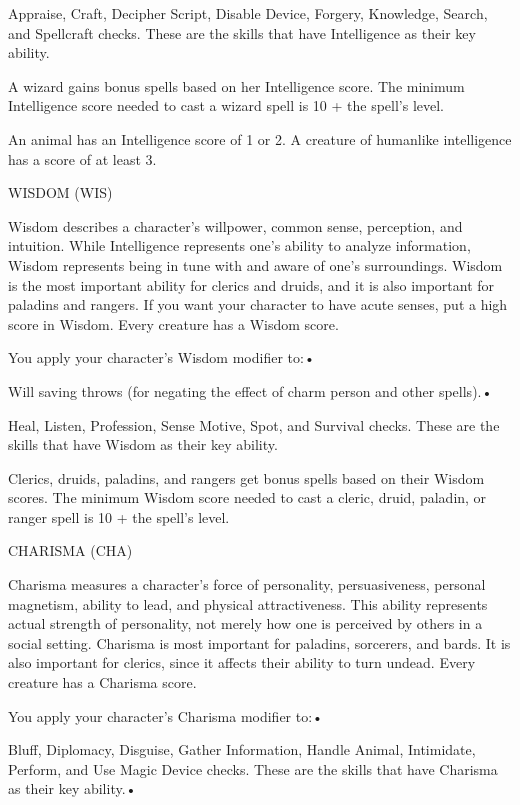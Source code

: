 \documentclass{article}
\begin{document}
\parindent=7pt
Appraise, Craft, Decipher Script, Disable Device, Forgery, Knowledge, Search, and 
Spellcraft checks. These are the skills that have Intelligence as their key ability.

\parindent=0pt
A wizard gains bonus spells based on her Intelligence score. The minimum Intelligence 
score needed to cast a wizard spell is 10 + the spell's level. 

An animal has an Intelligence score of 1 or 2. A creature of humanlike intelligence 
has a score of at least 3.

\vspace{12pt}
WISDOM (WIS)

Wisdom describes a character's willpower, common sense, perception, and intuition. 
While Intelligence represents one's ability to analyze information, Wisdom represents 
being in tune with and aware of one's surroundings. Wisdom is the most important 
ability for clerics and druids, and it is also important for paladins and rangers. 
If you want your character to have acute senses, put a high score in Wisdom. Every 
creature has a Wisdom score.

You apply your character's Wisdom modifier to:• 

\parindent=3pt
Will saving throws (for negating the effect of charm person and other spells).• 

Heal, Listen, Profession, Sense Motive, Spot, and Survival checks. These are the 
skills that have Wisdom as their key ability.

Clerics, druids, paladins, and rangers get bonus spells based on their Wisdom scores. 
The minimum Wisdom score needed to cast a cleric, druid, paladin, or ranger spell 
is 10 + the spell's level.

\vspace{12pt}
\parindent=0pt
CHARISMA (CHA)

Charisma measures a character's force of personality, persuasiveness, personal 
magnetism, ability to lead, and physical attractiveness. This ability represents 
actual strength of personality, not merely how one is perceived by others in a 
social setting. Charisma is most important for paladins, sorcerers, and bards. 
It is also important for clerics, since it affects their ability to turn undead. 
Every creature has a Charisma score.

You apply your character's Charisma modifier to:• 

\parindent=3pt
Bluff, Diplomacy, Disguise, Gather Information, Handle Animal, Intimidate, Perform, 
and Use Magic Device checks. These are the skills that have Charisma as their key 
ability.• 
\end{document}
